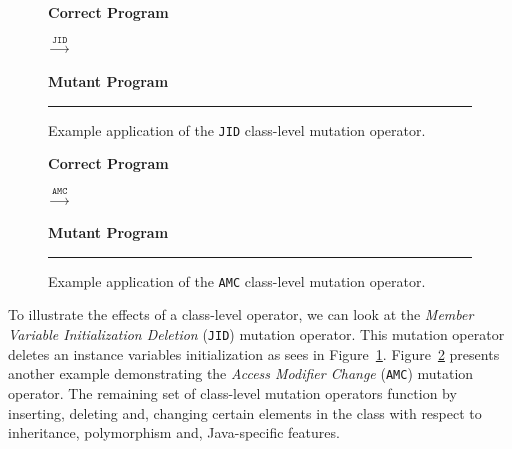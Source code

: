 \begin{figure}[ht!]
  \centering
  \begin{minipage}{6.5cm}
  \centering
  \footnotesize{\textbf{Correct Program}}
  
  \end{minipage}
  $\xrightarrow{\texttt{JID}}$
  \begin{minipage}{6.5cm}
  \centering
  \footnotesize{\textbf{Mutant Program}}
  
  \end{minipage}
  \caption{Example application of the \texttt{JID} class-level mutation operator.}
  \vspace{2mm}
  \hrule
  \label{fig:JID_mutation}
\end{figure}

\begin{figure}[ht!]
  \centering
  \begin{minipage}{6.5cm}
  \centering
  \footnotesize{\textbf{Correct Program}}
  
  \end{minipage}
  $\xrightarrow{\texttt{AMC}}$
  \begin{minipage}{6.5cm}
  \centering
  \footnotesize{\textbf{Mutant Program}}
  
  \end{minipage}
  \caption{Example application of the \texttt{AMC} class-level mutation operator.}
  \vspace{2mm}
  \hrule
  \label{fig:AMC_mutation}
\end{figure}

To illustrate the effects of a class-level operator, we can look at the \emph{Member Variable Initialization Deletion} (\texttt{JID}) mutation operator. This mutation operator deletes an instance variables initialization as sees in Figure~\ref{fig:JID_mutation}. Figure~\ref{fig:AMC_mutation} presents another example demonstrating the \emph{Access Modifier Change} (\texttt{AMC}) mutation operator. The remaining set of class-level mutation operators function by inserting, deleting and, changing certain elements in the class with respect to inheritance, polymorphism and, Java-specific features.


